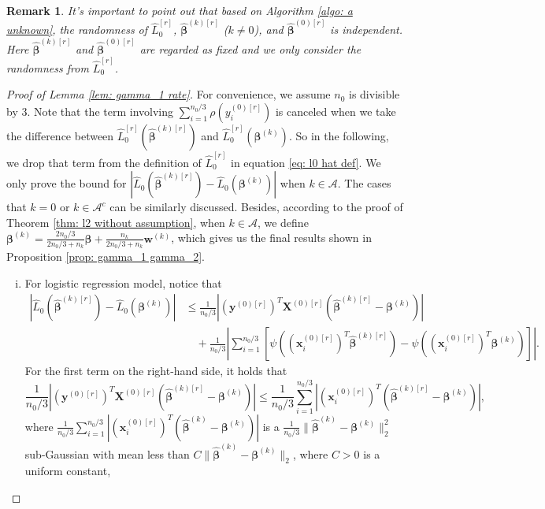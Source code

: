 \documentclass[12pt]{article}
\newcommand{\twonorm}[1]{\|#1\|_{2}}
\newcommand{\norma}[1]{\left|#1\right|}
\newcommand{\norm}[1]{|#1|}
\newcommand{\bbeta}{\bm{\beta}}
\newcommand{\hbeta}{\hat{\bm{\beta}}}
\newcommand{\bbetak}[1]{\bm{\beta}^{(#1)}}
\newcommand{\hbetak}[1]{\hat{\bm{\beta}}^{(#1)}}
\newcommand{\bx}{\bm{x}}
\newcommand{\bwk}[1]{\bm{w}^{(#1)}}
\newcommand{\ma}{\mathcal{A}}
\newcommand{\mac}{\mathcal{A}^c}
\newcommand{\by}{\bm{y}}
\newcommand{\bX}{\bm{X}}
\newcommand{\<}{\langle}
\renewcommand{\>}{\rangle}
\newtheorem{remark}{Remark}
\begin{document}
\begin{remark}
	It's important to point out that based on Algorithm \ref{algo: a unknown}, the randomness of $\hat{L}_0^{[r]}$, $\hbeta^{(k)[r]}$ ($k \neq 0$), and $\hbeta^{(0)[r]}$ is independent. Here $\hbeta^{(k)[r]}$ and $\hbeta^{(0)[r]}$ are regarded as fixed and we only consider the randomness from $\hat{L}_0^{[r]}$.
\end{remark}

\begin{proof}[Proof of Lemma \ref{lem: gamma_1 rate}]
For convenience, we assume $n_0$ is divisible by 3. Note that the term involving $\sum_{i=1}^{n_0/3}\rho(y^{(0)[r]}_i)$ is canceled when we take the difference between $\hat{L}_0^{[r]}(\hbeta^{(k)[r]})$ and $\hat{L}_0^{[r]}(\bbetak{k})$. So in the following, we drop that term from the definition of  $\hat{L}_0^{[r]}$ in equation \eqref{eq: l0 hat def}. We only prove the bound for $\norm{\hat{L}_0(\hbeta^{(k)[r]})-\hat{L}_0(\bbetak{k})}$ when $k \in \ma$. The cases that $k = 0$ or $k \in \mac$ can be similarly discussed. Besides, according to the proof of Theorem \ref{thm: l2 without assumption}, when $k \in \ma$, we define $\bbetak{k} = \frac{2n_0/3}{2n_0/3+n_k}\bbeta + \frac{n_k}{2n_0/3+n_k}\bwk{k}$, which gives us the final results shown in Proposition \ref{prop: gamma_1 gamma_2}.
	\begin{enumerate}[(i)]
		\item For logistic regression model, notice that
		\begin{align}
			\norm{\hat{L}_0(\hbeta^{(k)[r]})-\hat{L}_0(\bbetak{k})} &\leq \frac{1}{n_0/3}\norm{(\by^{(0)[r]})^T \bX^{(0)[r]}(\hbeta^{(k)[r]}-\bbetak{k})} \\
			&\quad + \frac{1}{n_0/3}\norma{\sum_{i=1}^{n_0/3}[\psi((\bx^{(0)[r]}_i)^T\hbeta^{(k)[r]})-\psi((\bx^{(0)[r]}_i)^T\bbetak{k})]}.
		\end{align}
		For the first term on the right-hand side, it holds that
		\begin{equation}
			\frac{1}{n_0/3}\norm{(\by^{(0)[r]})^T \bX^{(0)[r]}(\hbeta^{(k)[r]}-\bbetak{k})} \leq \frac{1}{n_0/3}\sum_{i=1}^{n_0/3}\norm{(\bx_i^{(0)[r]})^T(\hbeta^{(k)[r]}-\bbetak{k})},
		\end{equation}
		where $\frac{1}{n_0/3}\sum_{i=1}^{n_0/3}\norm{(\bx_i^{(0)[r]})^T(\hbetak{k}-\bbetak{k})}$ is a $\frac{1}{n_0/3}\twonorm{\hbetak{k}-\bbetak{k}}^2$ sub-Gaussian with mean less than $C\twonorm{\hbetak{k}-\bbetak{k}}$, where $C>0$ is a uniform constant,

\end{enumerate}
\end{proof}
\end{document}
